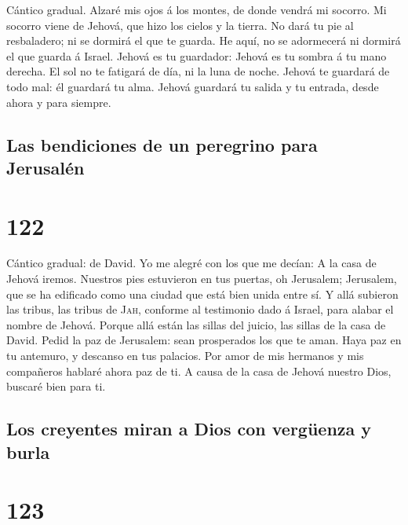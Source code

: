  Cántico gradual. Alzaré mis ojos á los montes, de donde
vendrá mi socorro.  Mi socorro viene de Jehová, que hizo
los cielos y la tierra.  No dará tu pie al resbaladero; ni
se dormirá el que te guarda.  He aquí, no se adormecerá ni
dormirá el que guarda á Israel.  Jehová es tu guardador:
Jehová es tu sombra á tu mano derecha.  El sol no te
fatigará de día, ni la luna de noche.  Jehová te guardará
de todo mal: él guardará tu alma.  Jehová guardará tu
salida y tu entrada, desde ahora y para siempre.

\hypertarget{las-bendiciones-de-un-peregrino-para-jerusaluxe9n}{%
\subsection{Las bendiciones de un peregrino para
Jerusalén}\label{las-bendiciones-de-un-peregrino-para-jerusaluxe9n}}

\hypertarget{section-121}{%
\section{122}\label{section-121}}

 Cántico gradual: de David. Yo me alegré con los que me
decían: A la casa de Jehová iremos.  Nuestros pies
estuvieron en tus puertas, oh Jerusalem;  Jerusalem, que
se ha edificado como una ciudad que está bien unida entre sí.
 Y allá subieron las tribus, las tribus de \textsc{Jah},
conforme al testimonio dado á Israel, para alabar el nombre de Jehová.
 Porque allá están las sillas del juicio, las sillas de la
casa de David.  Pedid la paz de Jerusalem: sean
prosperados los que te aman.  Haya paz en tu antemuro, y
descanso en tus palacios.  Por amor de mis hermanos y mis
compañeros hablaré ahora paz de ti.  A causa de la casa de
Jehová nuestro Dios, buscaré bien para ti.

\hypertarget{los-creyentes-miran-a-dios-con-verguxfcenza-y-burla}{%
\subsection{Los creyentes miran a Dios con vergüenza y
burla}\label{los-creyentes-miran-a-dios-con-verguxfcenza-y-burla}}

\hypertarget{section-122}{%
\section{123}\label{section-122}}

